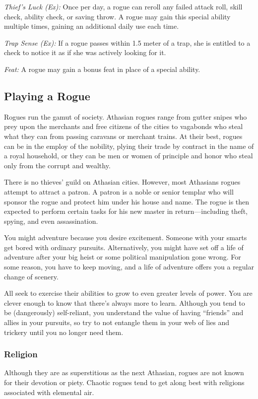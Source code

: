 \textit{Thief's Luck (Ex):} Once per day, a rogue can reroll any failed attack roll, skill check, ability check, or saving throw. A rogue may gain this special ability multiple times, gaining an additional daily use each time.

\textit{Trap Sense (Ex):} If a rogue passes within 1.5 meter of a trap, she is entitled to a  check to notice it as if she was actively looking for it.

\textit{Feat:} A rogue may gain a bonus feat in place of a special ability.

\subsection{Playing a Rogue}
Rogues run the gamut of society. Athasian rogues range from gutter snipes who prey upon the merchants and free citizens of the cities to vagabonds who steal what they can from passing caravans or merchant trains. At their best, rogues can be in the employ of the nobility, plying their trade by contract in the name of a royal household, or they can be men or women of principle and honor who steal only from the corrupt and wealthy.

There is no thieves' guild on Athasian cities. However, most Athasians rogues attempt to attract a patron. A patron is a noble or senior templar who will sponsor the rogue and protect him under his house and name. The rogue is then expected to perform certain tasks for his new master in return---including theft, spying, and even assassination.

You might adventure because you desire excitement. Someone with your smarts get bored with ordinary pursuits. Alternatively, you might have set off a life of adventure after your big heist or some political manipulation gone wrong. For some reason, you have to keep moving, and a life of adventure offers you a regular change of scenery.

All seek to exercise their abilities to grow to even greater levels of power. You are clever enough to know that there's always more to learn. Although you tend to be (dangerously) self-reliant, you understand the value of having ``friends'' and allies in your pursuits, so try to not entangle them in your web of lies and trickery until you no longer need them.

\subsubsection{Religion}
Although they are as superstitious as the next Athasian, rogues are not known for their devotion or piety. Chaotic rogues tend to get along best with religions associated with elemental air.

